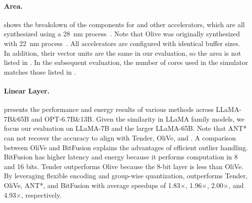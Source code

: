 \paragraph{Area.}
 shows the breakdown of the components for \proj and other accelerators, which are all synthesized using a 28~nm process~\cite{guo2022ant,lee2024tenderacceleratinglargelanguage}.
Note that Olive was originally synthesized with 22~nm process~\cite{guo2023olive}.
All accelerators are configured with identical buffer sizes.
In addition, their vector units are the same in our evaluation, so the area is not listed in .
In the subsequent evaluation, the number of cores used in the simulator matches those listed in .




\paragraph{Linear Layer.}
 presents the performance and energy results of various methods across LLaMA-7B\&65B and OPT-6.7B\&13B.
Given the similarity in LLaMA family models, we focus our evaluation on LLaMA-7B and the larger LLaMA-65B.
Note that ANT* can not recover the accuracy to align with Tender, OliVe, and \proj.
A comparison between OliVe and BitFusion explains the advantages of efficient outlier handling.
BitFusion has higher latency and energy because it performs computation in 8 and 16 bits.
Tender outperforms Olive because the 8-bit layer is less than OliVe.
By leveraging flexible encoding and group-wise quantization, \proj outperforms Tender, OliVe, ANT*, and BitFusion with average speedups of 1.83$\times$, 1.96$\times$, 2.00$\times$, and 4.93$\times$, respectively.


